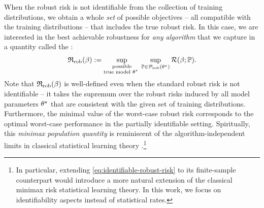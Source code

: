 When the robust risk is not identifiable from the collection of training distributions, 
we obtain a whole \emph{set} of possible objectives -- all compatible with the training distributions -- that includes 
the true robust risk. 
In this case, we are interested in the best achievable robustness for \emph{any algorithm}
that we capture in a quantity
called the \emph{\idRR}:
\begin{align}
\label{eq:identifiable-robust-risk}
    \mathfrak{R}_{\mathrm{rob}}(\beta) := \sup_{\substack{\text{possible}\\ \text{true model $\theta^{\star}$ }}}  \sup_{\mathbb{P} \in \mathcal{P}_{\text{rob}}(\theta^{\star})} \mathcal{R} (\beta; \mathbb{P}).
\end{align}
Note that $\mathfrak{R}_{\mathrm{rob}}(\beta)$ is well-defined %
even when the standard robust risk is not identifiable -- 
it takes the supremum over the robust risks induced by 
all model parameters $\theta^{\star}$
that are consistent with the given set of training distributions. 
Furthermore, the minimal value of the worst-case robust risk corresponds to the optimal worst-case performance in the partially identifiable setting.
Spiritually, this \emph{minimax population quantity} is reminiscent of the 
algorithm-independent limits in classical statistical learning theory \cite{yu1997assouad}.\footnote{In particular, extending \eqref{eq:identifiable-robust-risk} to its finite-sample counterpart would introduce a more natural extension of the classical minimax risk statistical learning theory.  In this work, we focus on identifiability aspects instead of statistical rates.}
